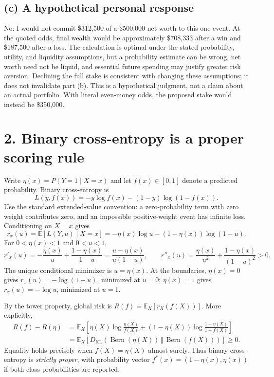 \documentclass[10pt,letterpaper]{article}
\newcommand{\E}{\mathbb{E}}
\begin{document}
\subsection*{(c) A hypothetical personal response}
No: I would not commit \$312,500 of a \$500,000 net worth to this one event.
At the quoted odds, final wealth would be approximately \$708,333 after a win and
\$187,500 after a loss. The calculation is optimal under the stated probability,
utility, and liquidity assumptions, but a probability estimate can be wrong,
net worth need not be liquid, and essential future spending may justify greater
risk aversion. Declining the full stake is consistent with changing these
assumptions; it does not invalidate part (b). This is a hypothetical judgment,
not a claim about an actual portfolio. With literal even-money odds, the proposed
stake would instead be \$350,000.

\newpage
\section*{2. Binary cross-entropy is a proper scoring rule}
Write $\eta(x)=P(Y=1\mid X=x)$ and let $f(x)\in[0,1]$ denote a predicted
probability. Binary cross-entropy is
\[
L(y,f(x))=-y\log f(x)-(1-y)\log(1-f(x)).
\]
Use the standard extended-value convention: a zero-probability term with zero
weight contributes zero, and an impossible positive-weight event has infinite loss.
Conditioning on $X=x$ gives
\[
r_x(u)=\E[L(Y,u)\mid X=x]
=-\eta(x)\log u-(1-\eta(x))\log(1-u).
\]
For $0<\eta(x)<1$ and $0<u<1$,
\[
r'_x(u)=-\frac{\eta(x)}u+\frac{1-\eta(x)}{1-u}
=\frac{u-\eta(x)}{u(1-u)},\qquad
r''_x(u)=\frac{\eta(x)}{u^2}+\frac{1-\eta(x)}{(1-u)^2}>0.
\]
The unique conditional minimizer is $u=\eta(x)$. At the boundaries,
$\eta(x)=0$ gives $r_x(u)=-\log(1-u)$, minimized at $u=0$;
$\eta(x)=1$ gives $r_x(u)=-\log u$, minimized at $u=1$.

By the tower property, global risk is $R(f)=\E_X[r_X(f(X))]$. More explicitly,
\begin{align*}
R(f)-R(\eta)
&=\E_X\!\left[
\eta(X)\log\frac{\eta(X)}{f(X)}
+(1-\eta(X))\log\frac{1-\eta(X)}{1-f(X)}\right]\\
&=\E_X\!\left[D_{\mathrm{KL}}\!\left(
\operatorname{Bern}(\eta(X))\,\Vert\,\operatorname{Bern}(f(X))\right)\right]\ge0.
\end{align*}
Equality holds precisely when $f(X)=\eta(X)$ almost surely. Thus binary
cross-entropy is \emph{strictly proper}, with probability vector
$f^*(x)=(1-\eta(x),\eta(x))$ if both class probabilities are reported.
\end{document}
